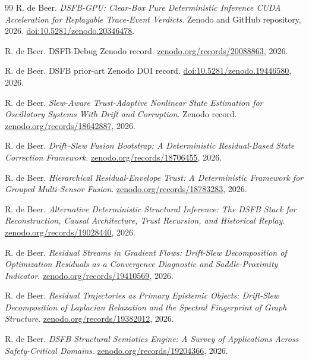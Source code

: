 \documentclass[11pt,a4paper]{article}
\begin{document}
\begin{thebibliography}{99}
R. de Beer.
\newblock \emph{DSFB-GPU: Clear-Box Pure Deterministic Inference CUDA Acceleration for Replayable Trace-Event Verdicts}.
\newblock Zenodo and GitHub repository, 2026.
\newblock \href{https://doi.org/10.5281/zenodo.20346478}{doi:10.5281/zenodo.20346478}.

R. de Beer.
\newblock DSFB-Debug Zenodo record.
\newblock \href{https://zenodo.org/records/20088863}{zenodo.org/records/20088863}, 2026.

R. de Beer.
\newblock DSFB prior-art Zenodo DOI record.
\newblock \href{https://doi.org/10.5281/zenodo.19446580}{doi:10.5281/zenodo.19446580}, 2026.

R. de Beer.
\newblock \emph{Slew-Aware Trust-Adaptive Nonlinear State Estimation for Oscillatory Systems With Drift and Corruption}.
\newblock Zenodo record.
\newblock \href{https://zenodo.org/records/18642887}{zenodo.org/records/18642887}, 2026.

R. de Beer.
\newblock \emph{Drift--Slew Fusion Bootstrap: A Deterministic Residual-Based State Correction Framework}.
\newblock \href{https://zenodo.org/records/18706455}{zenodo.org/records/18706455}, 2026.

R. de Beer.
\newblock \emph{Hierarchical Residual-Envelope Trust: A Deterministic Framework for Grouped Multi-Sensor Fusion}.
\newblock \href{https://zenodo.org/records/18783283}{zenodo.org/records/18783283}, 2026.

R. de Beer.
\newblock \emph{Alternative Deterministic Structural Inference: The DSFB Stack for Reconstruction, Causal Architecture, Trust Recursion, and Historical Replay}.
\newblock \href{https://zenodo.org/records/19028440}{zenodo.org/records/19028440}, 2026.

R. de Beer.
\newblock \emph{Residual Streams in Gradient Flows: Drift-Slew Decomposition of Optimization Residuals as a Convergence Diagnostic and Saddle-Proximity Indicator}.
\newblock \href{https://zenodo.org/records/19410569}{zenodo.org/records/19410569}, 2026.

R. de Beer.
\newblock \emph{Residual Trajectories as Primary Epistemic Objects: Drift-Slew Decomposition of Laplacian Relaxation and the Spectral Fingerprint of Graph Structure}.
\newblock \href{https://zenodo.org/records/19382012}{zenodo.org/records/19382012}, 2026.

R. de Beer.
\newblock \emph{DSFB Structural Semiotics Engine: A Survey of Applications Across Safety-Critical Domains}.
\newblock \href{https://zenodo.org/records/19204366}{zenodo.org/records/19204366}, 2026.

\end{thebibliography}
\endgroup
\end{document}
